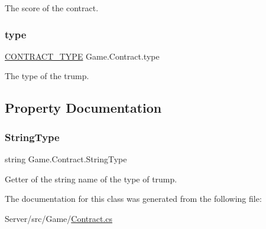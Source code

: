 The score of the contract. \mbox{\label{class_game_1_1_contract_a1aac9f683f470e81feda00aadb2fab03}} 
\subsubsection{\texorpdfstring{type}{type}}
{\footnotesize\ttfamily \hyperlink{namespace_game_ae93b4df2175d9820e5d19dc1ab708e7e}{C\+O\+N\+T\+R\+A\+C\+T\+\_\+\+T\+Y\+PE} Game.\+Contract.\+type}

The type of the trump. 

\subsection{Property Documentation}
\mbox{\label{class_game_1_1_contract_a10bb0c1876d9fe6c7a632e263171455c}} 
\subsubsection{\texorpdfstring{String\+Type}{StringType}}
{\footnotesize\ttfamily string Game.\+Contract.\+String\+Type\hspace{0.3cm}{\ttfamily [get]}}

Getter of the string name of the type of trump. 

The documentation for this class was generated from the following file\+:\begin{DoxyCompactItemize}
\item 
Server/src/\+Game/\hyperlink{_contract_8cs}{Contract.\+cs}\end{DoxyCompactItemize}
